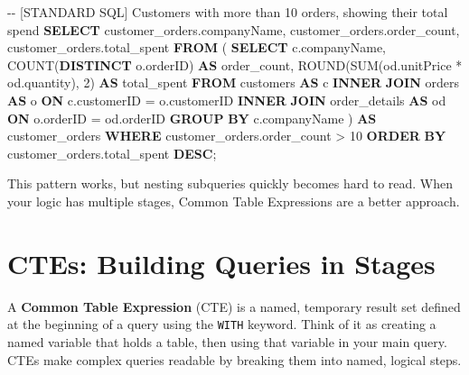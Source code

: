\documentclass[
  letterpaper,
  DIV=11,
  numbers=noendperiod]{scrreprt}
\newenvironment{Shaded}{\begin{snugshade}}{\end{snugshade}}
\newcommand{\CommentTok}[1]{\textcolor[rgb]{0.37,0.37,0.37}{#1}}
\newcommand{\DecValTok}[1]{\textcolor[rgb]{0.68,0.00,0.00}{#1}}
\newcommand{\FunctionTok}[1]{\textcolor[rgb]{0.28,0.35,0.67}{#1}}
\newcommand{\KeywordTok}[1]{\textcolor[rgb]{0.00,0.23,0.31}{\textbf{#1}}}
\newcommand{\NormalTok}[1]{\textcolor[rgb]{0.00,0.23,0.31}{#1}}
\newcommand{\OperatorTok}[1]{\textcolor[rgb]{0.37,0.37,0.37}{#1}}
\begin{document}
\begin{codelisting}

\caption{\texttt{duckdb}}

\begin{Shaded}
\begin{Highlighting}[]
\CommentTok{{-}{-} [STANDARD SQL] Customers with more than 10 orders, showing their total spend}
\KeywordTok{SELECT}
\NormalTok{    customer\_orders.companyName,}
\NormalTok{    customer\_orders.order\_count,}
\NormalTok{    customer\_orders.total\_spent}
\KeywordTok{FROM}\NormalTok{ (}
    \KeywordTok{SELECT}
\NormalTok{        c.companyName,}
        \FunctionTok{COUNT}\NormalTok{(}\KeywordTok{DISTINCT}\NormalTok{ o.orderID) }\KeywordTok{AS}\NormalTok{ order\_count,}
        \FunctionTok{ROUND}\NormalTok{(}\FunctionTok{SUM}\NormalTok{(od.unitPrice }\OperatorTok{*}\NormalTok{ od.quantity), }\DecValTok{2}\NormalTok{) }\KeywordTok{AS}\NormalTok{ total\_spent}
    \KeywordTok{FROM}\NormalTok{ customers }\KeywordTok{AS}\NormalTok{ c}
    \KeywordTok{INNER} \KeywordTok{JOIN}\NormalTok{ orders }\KeywordTok{AS}\NormalTok{ o }\KeywordTok{ON}\NormalTok{ c.customerID }\OperatorTok{=}\NormalTok{ o.customerID}
    \KeywordTok{INNER} \KeywordTok{JOIN}\NormalTok{ order\_details }\KeywordTok{AS}\NormalTok{ od }\KeywordTok{ON}\NormalTok{ o.orderID }\OperatorTok{=}\NormalTok{ od.orderID}
    \KeywordTok{GROUP} \KeywordTok{BY}\NormalTok{ c.companyName}
\NormalTok{) }\KeywordTok{AS}\NormalTok{ customer\_orders}
\KeywordTok{WHERE}\NormalTok{ customer\_orders.order\_count }\OperatorTok{\textgreater{}} \DecValTok{10}
\KeywordTok{ORDER} \KeywordTok{BY}\NormalTok{ customer\_orders.total\_spent }\KeywordTok{DESC}\NormalTok{;}
\end{Highlighting}
\end{Shaded}

\end{codelisting}

This pattern works, but nesting subqueries quickly becomes hard to read.
When your logic has multiple stages, Common Table Expressions are a
better approach.

\section{CTEs: Building Queries in
Stages}\label{ctes-building-queries-in-stages}

A \textbf{Common Table Expression} (CTE) is a named, temporary result
set defined at the beginning of a query using the \texttt{WITH} keyword.
Think of it as creating a named variable that holds a table, then using
that variable in your main query. CTEs make complex queries readable by
breaking them into named, logical steps.
\end{document}
